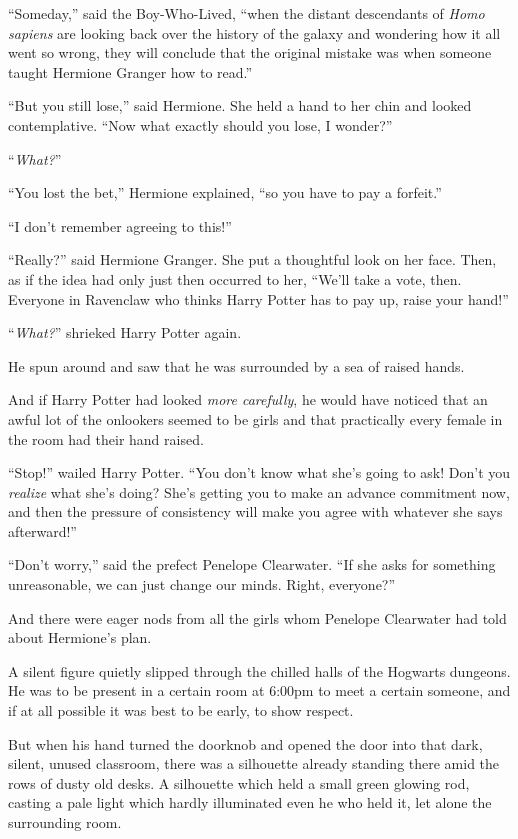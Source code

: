 “Someday,” said the Boy-Who-Lived, “when the distant descendants of \emph{Homo sapiens} are looking back over the history of the galaxy and wondering how it all went so wrong, they will conclude that the original mistake was when someone taught Hermione Granger how to read.”

“But you still lose,” said Hermione. She held a hand to her chin and looked contemplative. “Now what exactly should you lose, I wonder?”

“\emph{What?}”

“You lost the bet,” Hermione explained, “so you have to pay a forfeit.”

“I don’t remember agreeing to this!”

“Really?” said Hermione Granger. She put a thoughtful look on her face. Then, as if the idea had only just then occurred to her, “We’ll take a vote, then. Everyone in Ravenclaw who thinks Harry Potter has to pay up, raise your hand!”

“\emph{What?}” shrieked Harry Potter again.

He spun around and saw that he was surrounded by a sea of raised hands.

And if Harry Potter had looked \emph{more carefully}, he would have noticed that an awful lot of the onlookers seemed to be girls and that practically every female in the room had their hand raised.

“Stop!” wailed Harry Potter. “You don’t know what she’s going to ask! Don’t you \emph{realize} what she’s doing? She’s getting you to make an advance commitment now, and then the pressure of consistency will make you agree with whatever she says afterward!”

“Don’t worry,” said the prefect Penelope Clearwater. “If she asks for something unreasonable, we can just change our minds. Right, everyone?”

And there were eager nods from all the girls whom Penelope Clearwater had told about Hermione’s plan.

\later

A silent figure quietly slipped through the chilled halls of the Hogwarts dungeons. He was to be present in a certain room at 6:00pm to meet a certain someone, and if at all possible it was best to be early, to show respect.

But when his hand turned the doorknob and opened the door into that dark, silent, unused classroom, there was a silhouette already standing there amid the rows of dusty old desks. A silhouette which held a small green glowing rod, casting a pale light which hardly illuminated even he who held it, let alone the surrounding room.

